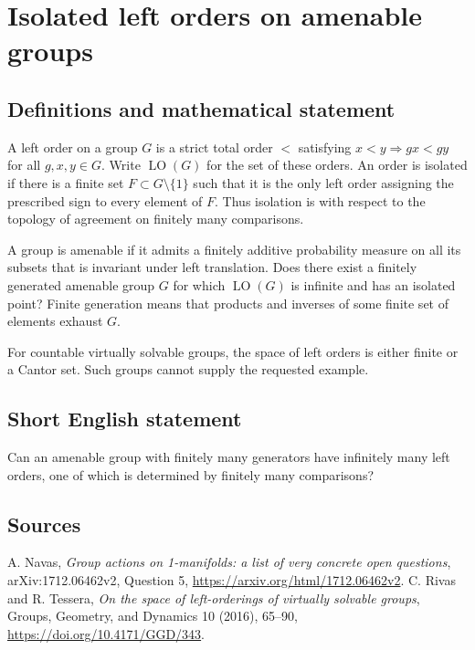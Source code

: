 \documentclass{article}
\begin{document}
\section*{Isolated left orders on amenable groups}
\subsection{Definitions and mathematical statement}
A left order on a group $G$ is a strict total order $<$ satisfying
$x<y\Rightarrow gx<gy$ for all $g,x,y\in G$.
Write $\operatorname{LO}(G)$ for the set of these orders.
An order is isolated if there is a finite set $F\subset G\setminus\{1\}$
such that it is the only left order assigning the prescribed sign to
every element of $F$. Thus isolation is with respect to the topology
of agreement on finitely many comparisons.

A group is amenable if it admits a finitely additive probability measure
on all its subsets that is invariant under left translation.
Does there exist a finitely generated amenable group $G$ for which
$\operatorname{LO}(G)$ is infinite and has an isolated point?
Finite generation means that products and inverses of some finite set
of elements exhaust $G$.

For countable virtually solvable groups, the space of left orders is
either finite or a Cantor set. Such groups cannot supply the requested example.
\subsection{Short English statement}
Can an amenable group with finitely many generators have infinitely many left orders, one of which is determined by finitely many comparisons?
\subsection{Sources}
A. Navas, \emph{Group actions on 1-manifolds: a list of very concrete open
questions}, arXiv:1712.06462v2, Question 5,
\url{https://arxiv.org/html/1712.06462v2}.
C. Rivas and R. Tessera, \emph{On the space of left-orderings of virtually
solvable groups}, Groups, Geometry, and Dynamics 10 (2016), 65--90,
\url{https://doi.org/10.4171/GGD/343}.
\end{document}
